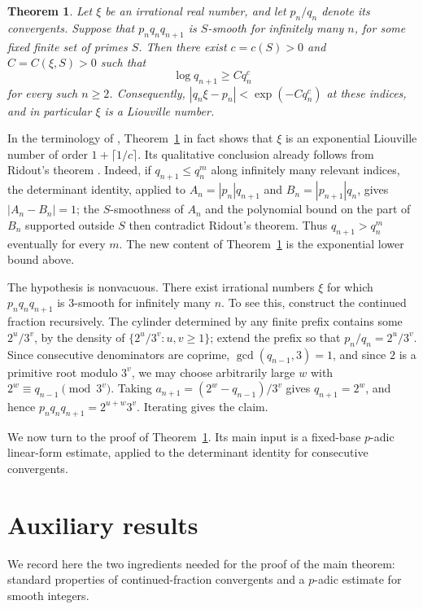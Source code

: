 \documentclass[11pt]{amsart}
\newtheorem{theorem}{Theorem}[section]
\theoremstyle{remark}
\begin{document}
\begin{theorem}\label{thm:main}
Let $\xi$ be an irrational real number, and let $p_n/q_n$ denote its
convergents. Suppose that $p_nq_nq_{n+1}$ is $S$-smooth for infinitely
many $n$, for some fixed finite set of primes $S$. Then there exist
$c=c(S)>0$ and $C=C(\xi,S)>0$ such that
\[
\log q_{n+1}\ge Cq_n^c
\]
for every such $n\ge2$. Consequently,
$|q_n\xi-p_n|<\exp(-Cq_n^c)$ at these indices, and in particular $\xi$
is a Liouville number.
\end{theorem}

In the terminology of \cite[Definition~2.1]{AriasKirilovMedeira2019},
Theorem~\ref{thm:main} in fact shows that $\xi$ is an exponential
Liouville number of order $1+\lceil1/c\rceil$. Its qualitative
conclusion already follows from Ridout's theorem \cite{Ridout1957}.
Indeed, if $q_{n+1}\le q_n^m$ along infinitely many relevant indices,
the determinant identity, applied to
$A_n=|p_n|q_{n+1}$ and $B_n=|p_{n+1}|q_n$, gives
$|A_n-B_n|=1$; the $S$-smoothness of $A_n$ and the polynomial bound on
the part of $B_n$ supported outside $S$ then contradict Ridout's
theorem. Thus $q_{n+1}>q_n^m$ eventually for every $m$. The new content
of Theorem~\ref{thm:main} is the exponential lower bound above.

The hypothesis is nonvacuous. There exist irrational numbers $\xi$ for
which $p_nq_nq_{n+1}$ is $3$-smooth for infinitely many $n$. To see
this, construct the continued fraction recursively. The cylinder
determined by any finite prefix contains some $2^u/3^v$, by the density
of $\{2^u/3^v:u,v\ge1\}$; extend the prefix so that
$p_n/q_n=2^u/3^v$. Since consecutive denominators are coprime,
$\gcd(q_{n-1},3)=1$, and since $2$ is a primitive root modulo $3^v$,
we may choose arbitrarily large $w$ with
$2^w\equiv q_{n-1}\pmod{3^v}$. Taking
$a_{n+1}=(2^w-q_{n-1})/3^v$ gives $q_{n+1}=2^w$, and hence
$p_nq_nq_{n+1}=2^{u+w}3^v$. Iterating gives the claim.

We now turn to the proof of Theorem~\ref{thm:main}. Its main input is a
fixed-base $p$-adic linear-form estimate, applied to the determinant
identity for consecutive convergents.

\section{Auxiliary results}

We record here the two ingredients needed for the proof of the main
theorem: standard properties of continued-fraction convergents and a
$p$-adic estimate for smooth integers.
\end{document}
